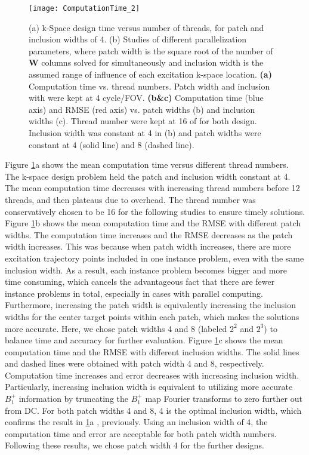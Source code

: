 \begin{figure}
	\centering
	\texttt{[image: ComputationTime\_2]}
	\caption{(a) k-Space design time versus number of threads, for patch and inclusion widths of 4. 
	(b) Studies of different parallelization parameters, where patch width is the square root of the number of $\mathbf{W}$ columns solved for simultaneously and inclusion width is the assumed range of influence of each excitation k-space location. \textbf{(a)} Computation time vs. thread numbers. Patch width and inclusion with were kept at 4 cycle/FOV. \textbf{(b\&c)} Computation time (blue axis) and RMSE (red axis) vs. patch widths (b) and inclusion widths (c). Thread number were kept at 16 of for both design. Inclusion width was constant at 4 in (b) and patch widths were constant at 4 (solid line) and 8 (dashed line).}
	\label{fig:ComputationTime}
\end{figure}
Figure \ref{fig:ComputationTime}a shows the mean computation time versus different thread numbers. The k-space design problem held the patch and inclusion width constant at 4. The mean computation time decreases with increasing thread numbers before 12 threads, and then plateaus due to overhead. The thread number was conservatively chosen to be 16 for the following studies to ensure timely solutions. 
Figure \ref{fig:ComputationTime}b shows the mean computation time and the RMSE with different patch widths. The computation time increases and the RMSE decreases as the patch width increases. This was because when patch width increases, there are more excitation trajectory points included in one instance problem, even with the same inclusion width. As a result, each instance problem becomes bigger and more time consuming, which cancels the advantageous fact that there are fewer instance problems in total, especially in cases with parallel computing. Furthermore, increasing the patch width is equivalently increasing the inclusion widths for the center target points within each patch, which makes the solutions more accurate. Here, we chose patch widths 4 and 8 (labeled $2^2$ and $2^3$) to balance time and accuracy for further evaluation.
Figure \ref{fig:ComputationTime}c shows the mean computation time and the RMSE with different inclusion widths. The solid lines and dashed lines were obtained with patch width 4 and 8, respectively. Computation time increases and error decreases with increasing inclusion width. Particularly, increasing inclusion width is equivalent to utilizing more accurate $B_1^+$ information by truncating the $B_1^+$ map Fourier transforms to zero further out from DC. For both patch widths 4 and 8, 4 is the optimal inclusion width, which confirms the result in \ref{fig:ComputationTime}a , previously. Using an inclusion width of 4, the computation time and error are acceptable for both patch width numbers. Following these results,  we chose patch width 4 for the further designs.


